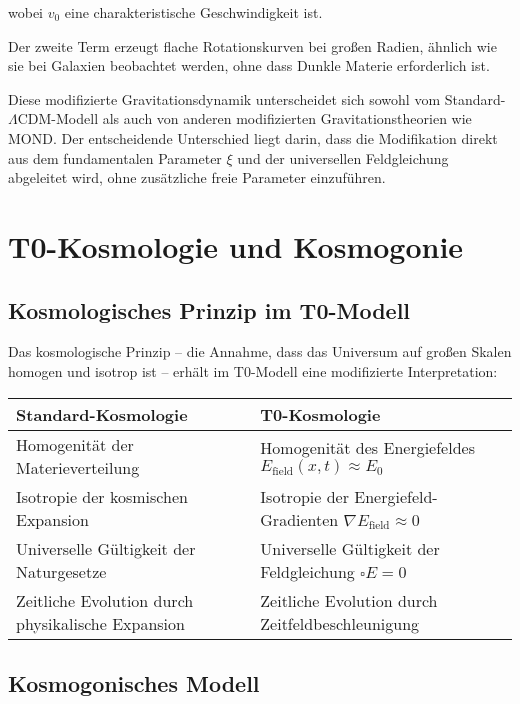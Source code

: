 \documentclass[12pt,a4paper]{article}
\theoremstyle{definition}
\begin{document}
wobei $v_0$ eine charakteristische Geschwindigkeit ist.

Der zweite Term erzeugt flache Rotationskurven bei großen Radien, ähnlich wie sie bei Galaxien beobachtet werden, ohne dass Dunkle Materie erforderlich ist.

\begin{wichtig}
	Diese modifizierte Gravitationsdynamik unterscheidet sich sowohl vom Standard-$\Lambda$CDM-Modell als auch von anderen modifizierten Gravitationstheorien wie MOND. Der entscheidende Unterschied liegt darin, dass die Modifikation direkt aus dem fundamentalen Parameter $\xi$ und der universellen Feldgleichung abgeleitet wird, ohne zusätzliche freie Parameter einzuführen.
\end{wichtig}

\section{T0-Kosmologie und Kosmogonie}

\subsection{Kosmologisches Prinzip im T0-Modell}

Das kosmologische Prinzip – die Annahme, dass das Universum auf großen Skalen homogen und isotrop ist – erhält im T0-Modell eine modifizierte Interpretation:

\begin{center}
	\begin{tabular}{|p{7cm}|p{7cm}|}
		\hline
		\textbf{Standard-Kosmologie} & \textbf{T0-Kosmologie} \\
		\hline
		Homogenität der Materieverteilung & Homogenität des Energiefeldes $E_{\text{field}}(x,t) \approx E_0$ \\
		\hline
		Isotropie der kosmischen Expansion & Isotropie der Energiefeld-Gradienten $\nabla E_{\text{field}} \approx 0$ \\
		\hline
		Universelle Gültigkeit der Naturgesetze & Universelle Gültigkeit der Feldgleichung $\square E = 0$ \\
		\hline
		Zeitliche Evolution durch physikalische Expansion & Zeitliche Evolution durch Zeitfeldbeschleunigung \\
		\hline
	\end{tabular}
\end{center}

\subsection{Kosmogonisches Modell}
\end{document}
